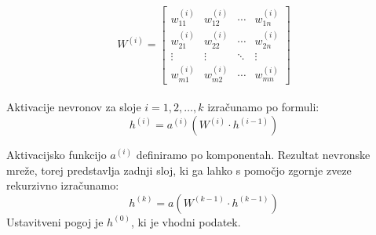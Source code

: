\[
W^{(i)} = \begin{bmatrix}
    w^{(i)}_{11} & w^{(i)}_{12} & \cdots & w^{(i)}_{1n} \\
    w^{(i)}_{21} & w^{(i)}_{22} & \cdots & w^{(i)}_{2n} \\
    \vdots & \vdots & \ddots & \vdots \\
    w^{(i)}_{m1} & w^{(i)}_{m2} & \cdots & w^{(i)}_{mn}
\end{bmatrix}
\] \\

Aktivacije nevronov za sloje $i = 1, 2, \ldots, k$ izračunamo po formuli: 
\begin{equation}
    h^{(i)} = a^{(i)}(W^{(i)} \cdot h^{(i - 1)})
\end{equation}

Aktivacijsko funkcijo $a^{(i)}$ definiramo po komponentah. Rezultat nevronske mreže, torej predstavlja zadnji sloj, ki ga lahko s pomočjo zgornje zveze rekurzivno izračunamo:
\begin{equation}
    h^{(k)} = a(W^{(k - 1)} \cdot h^{(k - 1)})
    \label{eq:eq1}
\end{equation}
Ustavitveni pogoj je $h^{(0)}$, ki je vhodni podatek.



